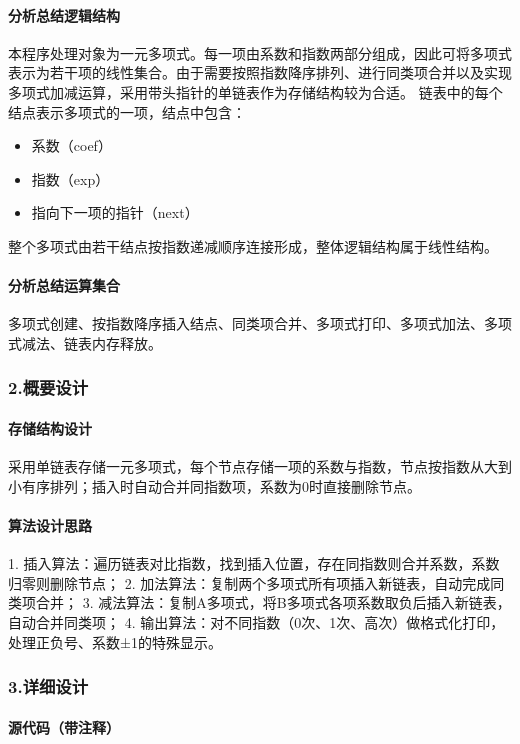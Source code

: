 \documentclass{ctexart}
\begin{document}
\paragraph{分析总结逻辑结构}
本程序处理对象为一元多项式。每一项由系数和指数两部分组成，因此可将多项式表示为若干项的线性集合。由于需要按照指数降序排列、进行同类项合并以及实现多项式加减运算，采用带头指针的单链表作为存储结构较为合适。
链表中的每个结点表示多项式的一项，结点中包含：
\begin{itemize}
    \item 系数（coef）
    \item 指数（exp）
    \item 指向下一项的指针（next）
\end{itemize}
整个多项式由若干结点按指数递减顺序连接形成，整体逻辑结构属于线性结构。

\paragraph{分析总结运算集合}
多项式创建、按指数降序插入结点、同类项合并、多项式打印、多项式加法、多项式减法、链表内存释放。

\subsubsection{2.概要设计}
\paragraph{存储结构设计}
采用单链表存储一元多项式，每个节点存储一项的系数与指数，节点按指数从大到小有序排列；插入时自动合并同指数项，系数为0时直接删除节点。
\paragraph{算法设计思路}
1. 插入算法：遍历链表对比指数，找到插入位置，存在同指数则合并系数，系数归零则删除节点；
2. 加法算法：复制两个多项式所有项插入新链表，自动完成同类项合并；
3. 减法算法：复制A多项式，将B多项式各项系数取负后插入新链表，自动合并同类项；
4. 输出算法：对不同指数（0次、1次、高次）做格式化打印，处理正负号、系数±1的特殊显示。

\subsubsection{3.详细设计}
\paragraph{源代码（带注释）}
\end{document}
